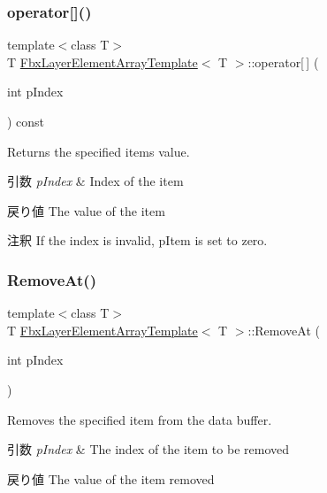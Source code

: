 \subsubsection{\texorpdfstring{operator[]()}{operator[]()}}
{\footnotesize\ttfamily template$<$class T$>$ \\
T \hyperlink{class_fbx_layer_element_array_template}{Fbx\+Layer\+Element\+Array\+Template}$<$ T $>$\+::operator\mbox{[}$\,$\mbox{]} (\begin{DoxyParamCaption}\item[{int}]{p\+Index }\end{DoxyParamCaption}) const}

Returns the specified item\textquotesingle{}s value. 
\begin{DoxyParams}{引数}
{\em p\+Index} & Index of the item \\
\hline
\end{DoxyParams}
\begin{DoxyReturn}{戻り値}
The value of the item 
\end{DoxyReturn}
\begin{DoxyRemark}{注釈}
If the index is invalid, p\+Item is set to zero. 
\end{DoxyRemark}
\mbox{\label{class_fbx_layer_element_array_template_a2ebd201d3d664e9b171d50561bfad1de}} 
\subsubsection{\texorpdfstring{Remove\+At()}{RemoveAt()}}
{\footnotesize\ttfamily template$<$class T$>$ \\
T \hyperlink{class_fbx_layer_element_array_template}{Fbx\+Layer\+Element\+Array\+Template}$<$ T $>$\+::Remove\+At (\begin{DoxyParamCaption}\item[{int}]{p\+Index }\end{DoxyParamCaption})}

Removes the specified item from the data buffer. 
\begin{DoxyParams}{引数}
{\em p\+Index} & The index of the item to be removed \\
\hline
\end{DoxyParams}
\begin{DoxyReturn}{戻り値}
The value of the item removed 
\end{DoxyReturn}
\mbox{\label{class_fbx_layer_element_array_template_abecc76d8203687b7963f2c4fa2d43a1e}} 

